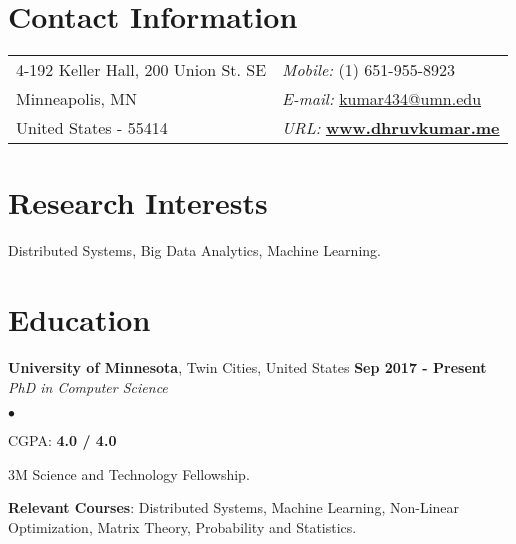 \documentclass[margin,line]{res}
\newenvironment{list2}{
  \begin{list}{$\bullet$}{%
      \setlength{\itemsep}{0in}
      \setlength{\parsep}{0in} \setlength{\parskip}{0in}
      \setlength{\topsep}{0in} \setlength{\partopsep}{0in} 
      \setlength{\leftmargin}{0.2in}}}{\end{list}}
\begin{document}

\begin{resume}
\section{\sc Contact Information}
\vspace{.05in}
\begin{tabular}{@{}p{3in}p{4in}}
4-192 Keller Hall, 200 Union St. SE         & {\it Mobile:}  (1) 651-955-8923 \\
Minneapolis, MN & {\it E-mail:}  \href{mailto:kumar434@umn.edu }{kumar434@umn.edu }\\
 United States - 55414 &{\it URL:}  \href{http://www.dhruvkumar.me}{\bf www.dhruvkumar.me}
\end{tabular}


\section{\sc Research Interests}
Distributed Systems, Big Data Analytics, Machine Learning.

\section{\sc Education}
{\bf University of Minnesota}, Twin Cities, United States \hfill {\bf {Sep 2017 - Present}}\\
{\em PhD in Computer Science }
\vspace*{.3cm}
\begin{list2}
\item CGPA:  {\bf {4.0 / 4.0}}
\item 3M Science and Technology Fellowship.
\item {\bf Relevant Courses}: Distributed Systems, Machine Learning, Non-Linear Optimization, Matrix Theory, Probability and Statistics.


\end{list2}
\end{resume}
\end{document}
